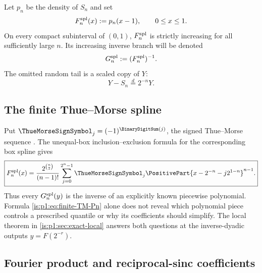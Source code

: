 Let $p_n$ be the density of $S_n$ and set
\begin{equation}
 F_{n}^{\mathrm{spl}}(x):=p_n(x-1),\qquad 0\le x\le1.
 \label{is:p1:eq:Pn-def}
\end{equation}
On every compact subinterval of $(0,1)$, $F_{n}^{\mathrm{spl}}$ is strictly increasing for all sufficiently
large $n$.  Its increasing inverse branch will be denoted
\begin{equation}
 G_{n}^{\mathrm{spl}}:=(F_{n}^{\mathrm{spl}})^{-1}.
 \label{is:p1:eq:Gn-def}
\end{equation}
The omitted random tail is a scaled copy of $Y$:
\begin{equation}
 Y-S_n\stackrel{d}=2^{-n}Y.
 \label{is:p1:eq:tail-copy}
\end{equation}

\subsection{The finite Thue--Morse spline}

Put $\ThueMorseSignSymbol_j=(-1)^{\BinaryDigitSum(j)}$, the signed Thue--Morse sequence \cite{is:p1:AlloucheShallit}.  The unequal-box inclusion--exclusion formula for the corresponding box spline \cite{is:p1:deBoorSplines} gives
\begin{equation}
 \boxed{
 \Fn(x)=\frac{2^{\binom n2}}{(n-1)!}
 \sum_{j=0}^{2^n-1}\ThueMorseSignSymbol_j
 \PositivePart{x-2^{-n}-j2^{1-n}}^{n-1}.}
 \label{is:p1:eq:finite-TM-Pn}
\end{equation}
Thus every $G_{n}^{\mathrm{spl}}(y)$ is the inverse of an explicitly known piecewise polynomial.  Formula
\eqref{is:p1:eq:finite-TM-Pn} alone does not reveal which polynomial piece controls a prescribed
quantile or why its coefficients should simplify.  The local theorem in \cref{is:p1:sec:exact-local}
answers both questions at the inverse-dyadic outputs $y=F(2^{-r})$.

\subsection{Fourier product and reciprocal-sinc coefficients}

